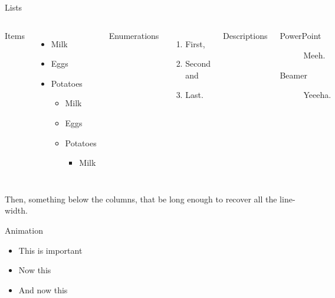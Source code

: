 \documentclass[aspectratio=169]{beamer}
\begin{document}
	\begin{frame}{Lists}
		\begin{columns}[T,onlytextwidth]
				Items
				\begin{itemize}
		  			\item Milk \item Eggs \item Potatoes
					\begin{itemize}
						\item Milk \item Eggs \item Potatoes
						\begin{itemize}
							\item Milk
						 \end{itemize}
				 	\end{itemize}
				\end{itemize}
			
				Enumerations
				\begin{enumerate}
		  			\item First, \item Second and \item Last.
				\end{enumerate}
			
				Descriptions
				\begin{description}
		  			\item[PowerPoint] Meeh. \item[Beamer] Yeeeha.
				\end{description}
		\end{columns}
		
		\vspace{1em}
		Then, something below the columns, that be long enough to recover all the line-width.
	\end{frame}
	
	\begin{frame}{Animation}
		\begin{itemize}%
			\item \alert<2>{This is important}
			\item Now this
			\item And now this
		\end{itemize}
	\end{frame}
	
\end{document}
